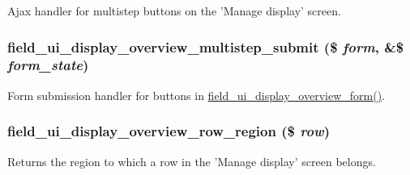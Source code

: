 \label{field__ui_8admin_8inc_abd91546e06594b68f40656e84141cacd}
Ajax handler for multistep buttons on the 'Manage display' screen. \hypertarget{field__ui_8admin_8inc_a5003d474d7984c50c9a16b33c5c4c403}{
\subsubsection[{field\_\-ui\_\-display\_\-overview\_\-multistep\_\-submit}]{\setlength{\rightskip}{0pt plus 5cm}field\_\-ui\_\-display\_\-overview\_\-multistep\_\-submit (\$ {\em form}, \/  \&\$ {\em form\_\-state})}}
\label{field__ui_8admin_8inc_a5003d474d7984c50c9a16b33c5c4c403}
Form submission handler for buttons in \hyperlink{group__forms_gad03c0a01179bc9ebb22b5c35784e1abf}{field\_\-ui\_\-display\_\-overview\_\-form()}. \hypertarget{field__ui_8admin_8inc_aac22d6a68a6fbdf179fc260770c11ce3}{
\subsubsection[{field\_\-ui\_\-display\_\-overview\_\-row\_\-region}]{\setlength{\rightskip}{0pt plus 5cm}field\_\-ui\_\-display\_\-overview\_\-row\_\-region (\$ {\em row})}}
\label{field__ui_8admin_8inc_aac22d6a68a6fbdf179fc260770c11ce3}
Returns the region to which a row in the 'Manage display' screen belongs.

